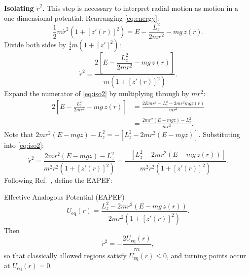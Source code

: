 \documentclass[11pt,letterpaper]{article}
\newcommand{\parhead}[1]{\par\medskip\noindent\textbf{#1}\ignorespaces}
\begin{document}
\parhead{Isolating $\dot{r}^2$.}
This step is necessary to interpret radial motion as motion in a one-dimensional potential. Rearranging \eqref{eq:energy}:
\begin{equation}\label{eq:iso1}
    \frac{1}{2}m\dot{r}^2\left(1 + [z'(r)]^2\right)
    = E - \frac{L_z^2}{2m r^2} - mg\,z(r).
\end{equation}
Divide both sides by $\tfrac{1}{2}m(1+[z']^2)$:
\begin{equation}\label{eq:iso2}
    \dot{r}^2
    = \frac{2\left[E - \dfrac{L_z^2}{2m r^2} - mg\,z(r)\right]}
           {m\left(1 + [z'(r)]^2\right)}.
\end{equation}
Expand the numerator of \eqref{eq:iso2} by multiplying through by $mr^2$:
\begin{align}
    2\left[E - \frac{L_z^2}{2m r^2} - mg\,z(r)\right]
    &= \frac{2E m r^2 - L_z^2 - 2m r^2 mg z(r)}{m r^2} \nonumber \\
    &= \frac{2m r^2(E - mg z) - L_z^2}{m r^2}.
    \label{eq:num}
\end{align}
Note that $2m r^2(E-mgz)-L_z^2 = -\left[L_z^2 - 2m r^2(E-mgz)\right]$. Substituting into \eqref{eq:iso2}:
\begin{equation}
    \dot{r}^2
    = \frac{2m r^2(E-mgz) - L_z^2}
           {m^2 r^2\left(1 + [z'(r)]^2\right)}
    = \frac{-\left[L_z^2 - 2m r^2\left(E - mg\,z(r)\right)\right]}
           {m^2 r^2\left(1 + [z'(r)]^2\right)}.
\end{equation}
Following Ref.~\cite{ajp2026}, define the EAPEF:
\begin{keyformulabox}{Effective Analogous Potential (EAPEF)}
\begin{equation}\label{eq:Ueq}
    U_{\mathrm{eq}}(r)
    = \frac{L_z^2 - 2m r^2\left(E - mg\,z(r)\right)}
           {2m r^2\left(1 + [z'(r)]^2\right)}.
\end{equation}
Then
\begin{equation}\label{eq:Ueq_motion}
    \dot{r}^2 = -\frac{2U_{\mathrm{eq}}(r)}{m},
\end{equation}
so that classically allowed regions satisfy $U_{\mathrm{eq}}(r)\le 0$, and turning points occur at $U_{\mathrm{eq}}(r)=0$.
\end{keyformulabox}
\end{document}
